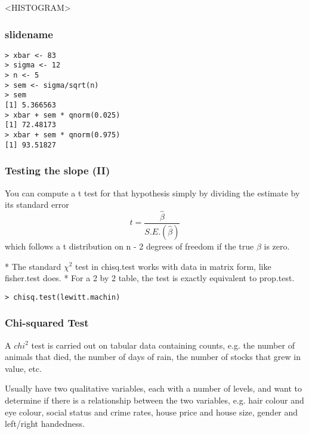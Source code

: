 \begin{itemize}
<HISTOGRAM>


\subsubsection{slidename}

\large \begin{verbatim}
> xbar <- 83
> sigma <- 12
> n <- 5
> sem <- sigma/sqrt(n)
> sem
[1] 5.366563
> xbar + sem * qnorm(0.025)
[1] 72.48173
> xbar + sem * qnorm(0.975)
[1] 93.51827
\end{verbatim}\large


\subsubsection{Testing the slope (II)}

You can compute a
t test for that hypothesis simply by dividing the estimate by its standard
error
\begin{equation}
t = \frac{\hat{\beta}}{S.E.(\hat{\beta})}
\end{equation}
which follows a t distribution on n - 2 degrees of freedom if the true $\beta$ is
zero.


\begin{itemize}
*  The standard $\chi^{2}$ test  in chisq.test works with data in matrix form, like fisher.test does.
*  For a 2 by 2 table, the test is exactly equivalent to prop.test.
\end{itemize}


\large \begin{verbatim}
> chisq.test(lewitt.machin)
\end{verbatim}\large



\subsubsection{Chi-squared Test}

A $chi^2$ test is carried out on tabular data containing counts, e.g. the
number of animals that died, the number of days of rain, the
number of stocks that grew in value, etc.

Usually have two qualitative variables, each with a number of
levels, and want to determine if there is a relationship between the
two variables, e.g. hair colour and eye colour, social status and
crime rates, house price and house size, gender and left/right
handedness.


\end{itemize}
